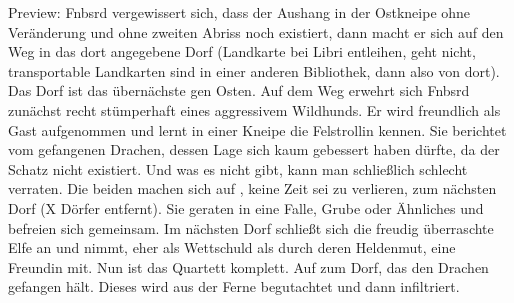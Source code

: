 Preview: Fnbsrd vergewissert sich, dass der Aushang in der Ostkneipe ohne Veränderung und ohne zweiten Abriss noch existiert, dann macht er sich auf den Weg in das dort angegebene Dorf (Landkarte bei Libri entleihen, geht nicht, transportable Landkarten sind in einer anderen Bibliothek, dann also von dort). Das Dorf ist das übernächste gen Osten.  Auf dem Weg erwehrt sich Fnbsrd zunächst recht stümperhaft eines aggressivem Wildhunds.  Er wird freundlich als Gast aufgenommen und lernt in einer Kneipe die Felstrollin kennen. Sie berichtet vom gefangenen Drachen, dessen Lage sich kaum gebessert haben dürfte, da der Schatz nicht existiert. Und was es nicht gibt, kann man schließlich schlecht verraten. Die beiden machen sich auf , keine Zeit sei zu verlieren, zum nächsten Dorf (X Dörfer entfernt). Sie geraten in eine Falle, Grube oder Ähnliches und befreien sich gemeinsam. Im nächsten Dorf schließt sich die freudig überraschte Elfe an und nimmt, eher als Wettschuld als durch deren Heldenmut, eine Freundin mit. Nun ist das Quartett komplett. Auf zum Dorf, das den Drachen gefangen hält. Dieses wird aus der Ferne begutachtet und dann infiltriert.




































































